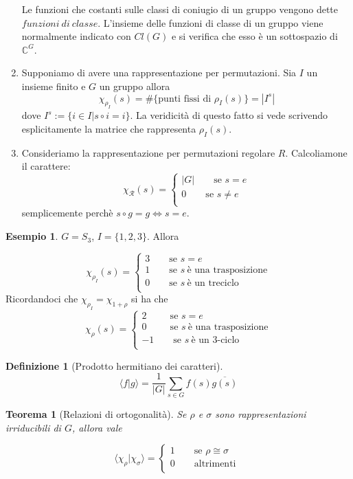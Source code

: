 \documentclass[11pt]{article}
\theoremstyle{plain}
\newtheorem{thm}{Teorema}[section]
\theoremstyle{definition}
\newtheorem{defn}{Definizione}[section]
\newtheorem{exmp}{Esempio}[section]
\theoremstyle{remark}
\newcommand{\dsum}{\displaystyle\sum}
\begin{document}
\begin{enumerate}
Le funzioni che costanti sulle classi di coniugio di un gruppo vengono dette $funzioni\ di\ classe$. L'insieme delle funzioni di classe di un gruppo viene normalmente indicato con $Cl(G)$ e si verifica che esso è un sottospazio di $\mathbb{C}^G$.
	\item Supponiamo di avere una rappresentazione per permutazioni. Sia $I$ un insieme finito e $G$ un gruppo allora 
$$\chi_{\rho_{I}}(s)=\#\{ \text{punti fissi di } \rho_I(s) \} = |I^s|$$
dove $I^s:=\{i\in I| s\circ i=i\}$. La veridicità di questo fatto si vede scrivendo esplicitamente la matrice che rappresenta $\rho_I(s)$.
	\item Consideriamo la rappresentazione per permutazioni regolare $R$. Calcoliamone il carattere:
	\[ \chi_{\mathcal{R}}(s) = \begin{cases}
|G| \qquad \text{se } s=e \\
0 \qquad \text{se } s\neq e\\
\end{cases} \]
semplicemente perchè $s\circ g=g\Leftrightarrow s=e$.
\end{enumerate}
\begin{exmp}
$G=S_3$, $I=\{1,2,3\}$. Allora

\[ \chi_{\rho_I}(s) = \begin{cases}
3 \qquad \text{se } s=e \\
1 \qquad \text{se } s\ \text{è una trasposizione}\\
0 \qquad \text{se } s\ \text{è un treciclo}\\
\end{cases} \]
Ricordandoci che $\chi_{\rho_I}=\chi_{1+\rho}$ si ha che 
\[ \chi_{\rho}(s) = \begin{cases}
2 \qquad \ \ \text{se } s=e \\
0 \qquad \ \ \text{se } s\ \text{è una trasposizione}\\
-1\qquad \text{se } s\ \text{è un } 3\text{-ciclo}\\
\end{cases} \]
\end{exmp}

\begin{defn}[Prodotto hermitiano dei caratteri]

\[ \langle f | g \rangle = \dfrac{1}{|G|} \dsum_{s \in G} f(s)\overline{ g(s)} \]

\end{defn}


\begin{thm}[Relazioni di ortogonalità]
Se $\rho$ e $\sigma$ sono rappresentazioni irriducibili di $G$, allora vale

\[\langle \chi_{\rho}|\chi_{\sigma} \rangle = \begin{cases}
1 \qquad \text{se } \rho \cong \sigma \\
0 \qquad \text{altrimenti }\\
\end{cases} \]
\label{relazione di ortogonalita}
\end{thm}
\end{document}
